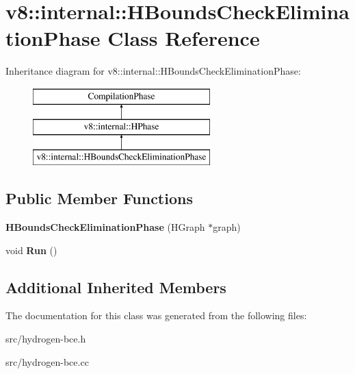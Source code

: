 \hypertarget{classv8_1_1internal_1_1_h_bounds_check_elimination_phase}{}\section{v8\+:\+:internal\+:\+:H\+Bounds\+Check\+Elimination\+Phase Class Reference}
\label{classv8_1_1internal_1_1_h_bounds_check_elimination_phase}
Inheritance diagram for v8\+:\+:internal\+:\+:H\+Bounds\+Check\+Elimination\+Phase\+:\begin{figure}[H]
\begin{center}
\leavevmode
\includegraphics[height=3.000000cm]{classv8_1_1internal_1_1_h_bounds_check_elimination_phase}
\end{center}
\end{figure}
\subsection*{Public Member Functions}
\begin{DoxyCompactItemize}
\item 
\hypertarget{classv8_1_1internal_1_1_h_bounds_check_elimination_phase_aa43024e96cb37ceaefe177bf2fa892d1}{}{\bfseries H\+Bounds\+Check\+Elimination\+Phase} (H\+Graph $\ast$graph)\label{classv8_1_1internal_1_1_h_bounds_check_elimination_phase_aa43024e96cb37ceaefe177bf2fa892d1}

\item 
\hypertarget{classv8_1_1internal_1_1_h_bounds_check_elimination_phase_a9ffb33e5008a03fd456110ff184d722c}{}void {\bfseries Run} ()\label{classv8_1_1internal_1_1_h_bounds_check_elimination_phase_a9ffb33e5008a03fd456110ff184d722c}

\end{DoxyCompactItemize}
\subsection*{Additional Inherited Members}


The documentation for this class was generated from the following files\+:\begin{DoxyCompactItemize}
\item 
src/hydrogen-\/bce.\+h\item 
src/hydrogen-\/bce.\+cc\end{DoxyCompactItemize}
